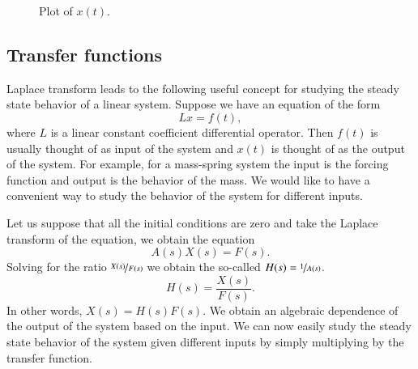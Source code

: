 \documentclass[12pt]{book}
\begin{document}
\begin{example}
\begin{figure}[h!t]
\capstart
\begin{center}
\caption{Plot of $x(t)$.\label{lt:heavisideexfig}}
\end{center}
\end{figure}
\end{example}

\subsection{Transfer functions}

Laplace transform leads to the following useful concept for studying the
steady state behavior of a linear system.  Suppose we have an equation of the
form
\begin{equation*}
L x = f(t) ,
\end{equation*}
where $L$ is a linear constant coefficient differential operator.
Then $f(t)$ is usually thought of as input of the system and $x(t)$ is
thought of as the output of the system.  For example, for a mass-spring
system the input is the forcing function and output is the behavior of the
mass.  We would like to have a convenient way to study the behavior of
the system for different inputs.

Let us suppose that
all the initial conditions are zero and take the Laplace transform
of the equation, we obtain the equation
\begin{equation*}
A(s) X(s) = F(s) .
\end{equation*}
Solving for the ratio $\nicefrac{X(s)}{F(s)}$ we obtain the so-called
\emph{}
$H(s) = \nicefrac{1}{A(s)}$.
\begin{equation*}
H(s) = \frac{X(s)}{F(s)} .
\end{equation*}
In other words, $X(s) = H(s) F(s)$.  We obtain an algebraic dependence of
the output of the system based on the input.  We can now easily study the
steady state behavior of the system given different inputs by simply
multiplying by the transfer function.
\end{document}
